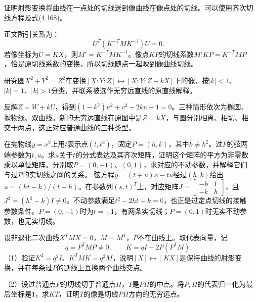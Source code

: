 证明射影变换将曲线在一点处的切线送到像曲线在像点处的切线。可以使用齐次切线方程及式\textup{(4.168)}。
\par

\par\smallskip\noindent 正文所引关系为：
\begin{equation*}
U^T(K^{-T}MK^{-1})U=0.
\end{equation*}
\solutionanswer
若像坐标为\(U=KX\)，则\(M'=K^{-T}MK^{-1}\)。像点\(KP\)的切线系数\(M'KP=K^{-T}MP\)，恰是原切线系数的变换，所以切线随点一起映到像曲线切线。


研究圆\(X^2+Y^2=Z^2\)在变换\([X:Y:Z]\mapsto[X:Y:Z-kX]\)下的像，按\(|k|<1\)、\(|k|=1\)、\(|k|>1\)分类，并联系被选作无穷远直线的原直线解释。
\par
\solutionanswer
反解\(Z=W+kU\)，得到\((1-k^2)u^2+v^2-2ku-1=0\)。三种情形依次为椭圆、抛物线、双曲线。新的无穷远直线在原图中是\(Z=kX\)，与圆分别相离、相切、相交于两点，这正对应普通曲线的三种类型。


在抛物线\(y=x^2\)上用\(t\)表示点\((t,t^2)\)，固定\(P=(h,k)\)，其中\(k\ne h^2\)。过\(P\)的弦两端参数为\(t,u\)。求\(u\)关于\(t\)的分式表达及其齐次矩阵，证明这个矩阵的平方为非零数乘以单位矩阵。分别取\(P=(0,-1)\)、\((0,1)\)，求对应的不动参数，并解释它们与过\(P\)的实切线之间的关系。
\solutionanswer
弦方程\(y=(t+u)x-tu\)经过\((h,k)\)给出\(u=(ht-k)/(t-h)\)。在参数列\((s,t)^T\)上，对应矩阵\(J=\begin{bmatrix}-h&1\\-k&h\end{bmatrix}\)，且\(J^2=(h^2-k)I\ne0\)。不动参数满足\(t^2-2ht+k=0\)，也正是过定点切线的接触参数条件。\(P=(0,-1)\)时为\(t=\pm1\)，有两条实切线；\(P=(0,1)\)时无实不动参数，也无实切线。


设非退化二次曲线\(X^TMX=0\)，\(M=M^T\)，\(P\)不在曲线上。取代表向量，记
\begin{equation*}
 q=P^TMP\ne0,\qquad K=qI-2P(P^TM).
\end{equation*}
（1）验证\(K^2=q^2I\)、\(K^TMK=q^2M\)，说明\([X]\mapsto[KX]\)是保持曲线的射影变换，并在每条过\(P\)的割线上互换两个曲线交点。

（2）设过普通点\(P\)的切线切于普通点\(H\)，\(T\)是\(PH\)的中点。将\(P,H\)的代表归一化为最后坐标是\(1\)，求\(KT\)，证明\(T\)的像是切线\(PH\)方向的无穷远点。

